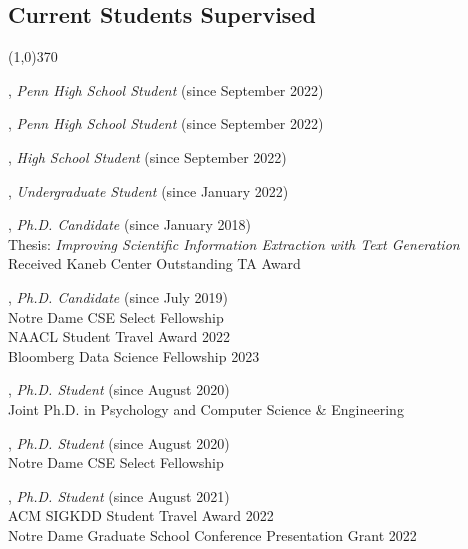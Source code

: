 \documentclass[10pt]{article}
\newenvironment{myindentpar}[1]%
{\begin{list}{}%
         {\setlength{\leftmargin}{#1}}%
         \item[]%
}
{\end{list}}
\newcounter{list}
\begin{document}
\subsection{\sc Current Students Supervised}
\vspace{-0.4cm} \line(1,0){370} \vspace{-0.1cm}

\begin{myindentpar}{0.75cm}

\hspace{-0.75cm}{\bf Ishita Masetty}, \textit{Penn High School Student} (since September 2022)

\hspace{-0.75cm}{\bf Jake Ciliberti}, \textit{Penn High School Student} (since September 2022)

\hspace{-0.75cm}{\bf Albert Lu}, \textit{High School Student} (since September 2022)

\hspace{-0.75cm}{\bf Weike Fang}, \textit{Undergraduate Student} (since January 2022)

\hspace{-0.75cm}{\bf Qingkai Zeng}, \textit{Ph.D. Candidate} (since January 2018) \\
	{Thesis: \textit{Improving Scientific Information Extraction with Text Generation}} \\
	{Received Kaneb Center Outstanding TA Award}

\hspace{-0.75cm}{\bf Wenhao Yu}, \textit{Ph.D. Candidate} (since July 2019) \\
	{Notre Dame CSE Select Fellowship} \\
	{NAACL Student Travel Award 2022} \\
	{Bloomberg Data Science Fellowship 2023}	

\hspace{-0.75cm}{\bf Ms. Lingbo Tong}, \textit{Ph.D. Student} (since August 2020) \\
	{Joint Ph.D. in Psychology and Computer Science \& Engineering}

\hspace{-0.75cm}{\bf Ms. Mengxia Yu}, \textit{Ph.D. Student} (since August 2020) \\
	{Notre Dame CSE Select Fellowship}

\hspace{-0.75cm}{\bf Gang Liu}, \textit{Ph.D. Student} (since August 2021) \\
	{ACM SIGKDD Student Travel Award 2022} \\
	{Notre Dame Graduate School Conference Presentation Grant 2022}


\end{myindentpar}
\end{document}
